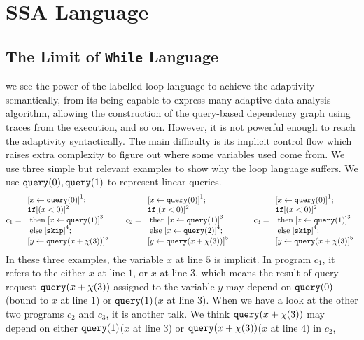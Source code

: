 \documentclass[a4paper,11pt]{article}
\begin{document}
\section{SSA Language  }
%
{
\subsection{The Limit of {\tt While} Language}
we see the power of the labelled loop language to achieve the adaptivity semantically, from its being capable to express many adaptive data analysis algorithm,  allowing the construction of the query-based dependency graph using traces from the execution, and so on.
However, it is not powerful enough to reach the adaptivity syntactically. The main difficulty is its implicit control flow which raises extra complexity to figure out where some variables used come from. We use three simple but relevant examples to show why the loop language suffers. We use ${\tt query}(0),{\tt query}(1)$ to represent linear queries.
%
\[
 c_1 = \begin{array}{l}
      \clabel{ \assign{x}{\query(0)}}^{1} ; \\
      \eif  [(x < 0 )]^{2} \\
      \ethen \clabel{\assign{x}{\query(1)}}^{3}\\
      \eelse \clabel{\eskip}^{4} ; \\
      \clabel{\assign{y}{\query(x+\chi(3))}}^{5}
 \end{array}
 ~~~~~
 c_2 = \begin{array}{l}
      \clabel{ \assign{x}{\query(0)}}^{1} ; \\
      \eif  [(x < 0 )]^{2} \\
      \ethen \clabel{\assign{x}{\query(1)}}^{3}\\
      \eelse \clabel{\assign{x}{\query(2)}}^{4} ; \\
      \clabel{\assign{y}{\query(x+\chi(3))}}^{5}
 \end{array}
 ~~~~~~~~
  c_3 = \begin{array}{l}
      \clabel{ \assign{x}{\query(0)}}^{1} ; \\
      \eif  [(x < 0 )]^{2} \\
      \ethen \clabel{\assign{z}{\query(1)}}^{3}\\
      \eelse \clabel{\eskip}^{4} ; \\
      \clabel{\assign{y}{\query(x+\chi(3)}}^{5}
 \end{array}
\]
In these three examples, the variable $x$ at line $5$ is implicit. In program $c_1$, it refers to the either $x$ at line $1$, or $x$ at line $3$, which means the result of query request ${\tt query}(x+\chi(3))$ assigned to the variable $y$ may depend on ${\tt query}(0)$(bound to $x$ at line $1$) or ${\tt query}(1)$($x$ at line $3$). When we have a look at the other two programs $c_2$ and $c_3$, it is another talk. We think ${\tt query}(x+\chi(3))$ may depend on either ${\tt query}(1)$($x$ at line $3$) or ${\tt query}(x+\chi(3))$($x$ at line $4$) in $c_2$,     
}
\end{document}

